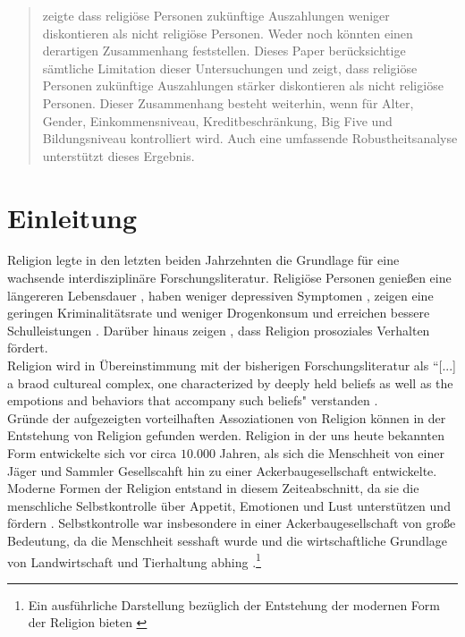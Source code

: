 \documentclass[11pt,a4paper]{article}
\begin{document}

\newpage
\tableofcontents
\listoffigures
\listoftables
\newpage
\begin{abstract}
\textcite{carter2012religious} zeigte dass religiöse Personen zukünftige Auszahlungen weniger diskontieren als nicht religiöse Personen. Weder \textcite{benjamin2013religious} noch \textcite{thornton2015divine} könnten einen derartigen Zusammenhang feststellen. Dieses Paper berücksichtige sämtliche Limitation dieser Untersuchungen und zeigt, dass religiöse Personen zukünftige Auszahlungen stärker diskontieren als nicht religiöse Personen. Dieser Zusammenhang besteht weiterhin, wenn für Alter, Gender, Einkommensniveau, Kreditbeschränkung, Big Five und Bildungsniveau kontrolliert wird. Auch eine umfassende Robustheitsanalyse unterstützt dieses Ergebnis. 
\end{abstract}

\section{Einleitung}

Religion legte in den letzten beiden Jahrzehnten die Grundlage für eine  wachsende interdisziplinäre Forschungsliteratur. Religiöse Personen genießen eine längereren Lebensdauer \parencite{mccullough2000religious}, haben weniger depressiven Symptomen \parencite{smith2003religiousness}, zeigen eine geringen  Kriminalitätsrate und weniger Drogenkonsum \parencite{baier2001if} und erreichen bessere Schulleistungen \parencite{jeynes2002meta}. Darüber hinaus zeigen \textcite{norenzayan2008origin}, dass Religion prosoziales Verhalten fördert.\\
Religion wird in Übereinstimmung mit der bisherigen Forschungsliteratur als  “[...] a braod cultureal complex, one characterized by deeply held beliefs as well as the empotions and behaviors that accompany such beliefs" verstanden \parencite{mccullough2013religion}.\\

Gründe der aufgezeigten vorteilhaften Assoziationen von Religion können in der Entstehung von Religion gefunden werden. Religion in der uns heute bekannten Form entwickelte sich vor circa $10.000$ Jahren, als sich die Menschheit von einer Jäger und Sammler Gesellscahft hin zu einer Ackerbaugesellschaft entwickelte\parencite{wright2010evolution}. Moderne Formen der Religion entstand in diesem Zeiteabschnitt, da sie die menschliche Selbstkontrolle über Appetit, Emotionen und Lust unterstützen und fördern \parencite{mccullough2013religion}. Selbstkontrolle war insbesondere in einer Ackerbaugesellschaft von große Bedeutung, da die Menschheit sesshaft wurde und die wirtschaftliche Grundlage von Landwirtschaft und Tierhaltung abhing \parencite{mccullough2013religion}.\footnote{Ein ausführliche Darstellung bezüglich der Entstehung der modernen Form der Religion bieten \textcite{mccullough2013religion}}\\
\end{document}
